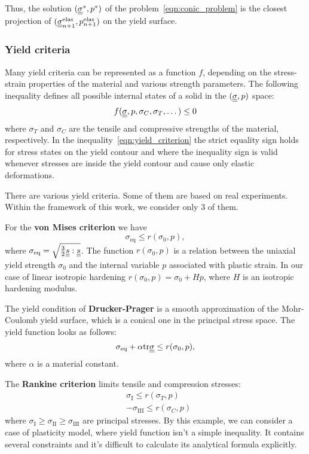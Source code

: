 \documentclass[12pt]{article}
\begin{document}
Thus, the solution $(\underline{\underline{\sigma}}^*, p^*)$ of the problem~\ref{eqn:conic_problem} is the closest projection of $(\underline{\underline{\sigma}}_{n+1}^{\text{elas}}, p_{n+1}^\text{elas})$ on the yield surface.

\subsubsection{Yield criteria}

Many yield criteria can be represented as a function $f$, depending on the stress-strain properties of the material and various strength parameters. The following inequality defines all possible internal states of a solid in the $(\underline{\underline{\sigma}}, p)$ space:
\begin{equation}\label{eqn:yield_criterion}
    f(\underline{\underline{\sigma}}, p, \sigma_C, \sigma_T, \dots) \leq 0
\end{equation}
where $\sigma_T$ and $\sigma_C$ are the tensile and compressive strengths of the material, respectively. In the inequality~\ref{eqn:yield_criterion} the strict equality sign holds for stress states on the yield contour and where the inequality sign is valid whenever stresses are inside the yield contour and cause only elastic deformations.

There are various yield criteria. Some of them are based on real experiments. Within the framework of this work, we consider only 3 of them. 

For the \textbf{von Mises criterion} we have
\begin{equation*}
    \sigma_\text{eq} \leq r(\sigma_0, p),
\end{equation*}
where $\sigma_\text{eq} = \sqrt{\frac{3}{2}\underline{\underline{s}} : \underline{\underline{s}}}$. The function $r(\sigma_0, p)$ is a relation between the uniaxial yield strength $\sigma_0$ and the internal variable $p$ associated with plastic strain. In our case of linear isotropic hardening $r(\sigma_0, p) = \sigma_0 + Hp$, where $H$ is an isotropic hardening modulus.

The yield condition of \textbf{Drucker-Prager} is a smooth approximation of the Mohr-Coulomb yield surface, which is a conical one in the principal stress space. The yield function looks as follows:
\begin{equation*}
    \sigma_\text{eq} + \alpha\mathrm{tr}\underline{\underline{\sigma}} \leq r(\sigma_0, p),
\end{equation*}
where $\alpha$ is a material constant.

The \textbf{Rankine criterion} limits tensile and compression stresses:
\begin{align*}
    & \sigma_\text{I} \leq r(\sigma_T, p) \\
    & -\sigma_\text{III} \leq r(\sigma_C, p)
\end{align*}
where $\sigma_\text{I} \geq \sigma_\text{II} \geq \sigma_\text{III}$ are principal stresses. By this example, we can consider a case of plasticity model, where yield function isn't a simple inequality. It contains several constraints and it's difficult to calculate its analytical formula explicitly.
\end{document}
